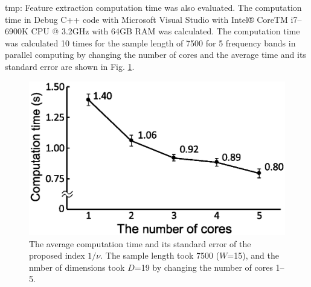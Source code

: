 \documentclass[journal]{IEEEtran}
\begin{document}
%
tmp:
Feature extraction computation time was also evaluated. The computation time in Debug C++ code with Microsoft Visual Studio with Intel® CoreTM i7–6900K CPU @ 3.2GHz with 64GB RAM was calculated. The computation time was calculated 10 times for the sample length of 7500 for 5 frequency bands in parallel computing by changing the number of cores and the average time and its standard error are  shown in Fig. \ref{fig:c_time}. 

\begin{figure}[!t]
\centering
\includegraphics[width=0.9\hsize]{figure/computation_time.eps}
\caption{The average computation time and its standard error of the proposed index $1/\nu$. The sample length took 7500 ($W$=15), and the nmber of dimensions took $D$=19 by changing the number of cores 1--5.}
\label{fig:c_time}
\end{figure}
\end{document}
